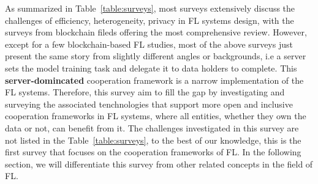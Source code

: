 As summarized in Table~\ref{table:surveys}, most surveys extensively discuss the challenges of efficiency, heterogeneity, privacy in FL systems design, with the surveys from blockchain fileds offering the most comprehensive review.
However, except for a few blockchain-based FL studies, most of the above surveys just present the same story from slightly different angles or backgrounds, i.e a server sets the model training task and delegate it to data holders to complete. 
This \textbf{server-domincated} cooperation framework is a narrow implementation of the FL systems.
Therefore, this survey aim to fill the gap by investigating and surveying the associated tenchnologies that support more open and inclusive cooperation frameworks in FL systems, where all entities, whether they own the data or not, can benefit from it. 
The challenges investigated in this survey are not listed in the Table~\ref{table:surveys}, to the best of our knowledge, this is the first survey that focuses on the cooperation frameworks of FL.
In the following section, we will differentiate this survey from other related concepts in the field of FL.

